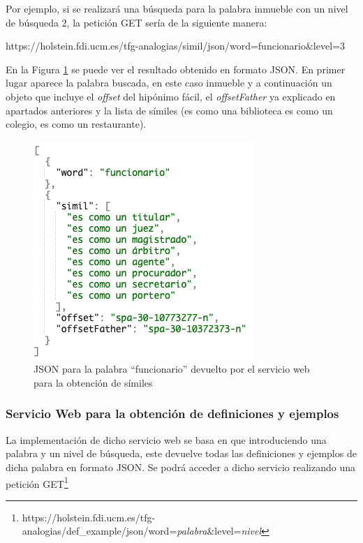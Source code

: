 Por ejemplo, si se realizará una búsqueda para la palabra inmueble con un nivel de búsqueda 2, la petición GET sería de la siguiente manera:

https://holstein.fdi.ucm.es/tfg-analogias/simil/json/word=funcionario\&level=3

En la Figura \ref{fig:peticionSimil} se puede ver el resultado obtenido en formato JSON. En primer lugar aparece la palabra buscada, en este caso inmueble y a continuación un objeto que incluye el \textit{offset} del hipónimo fácil, el \textit{offsetFather}  ya explicado en apartados anteriores y la lista de símiles (es como una biblioteca es como un colegio, es como un restaurante).

\begin{figure}[!h]
	\includegraphics[width=.6\textwidth]{Imagenes/Bitmap/Capitulo4/JSON-SW/peticionSimil.png}
	\centering
	\caption{JSON para la palabra ``funcionario'' devuelto por el servicio web para la obtención de símiles}
	\label{fig:peticionSimil}
\end{figure}


\subsubsection{Servicio Web para la obtención de definiciones y ejemplos}
\label{cap:subsec:sw_def_example}

La implementación de dicho servicio web se basa en que introduciendo una palabra y un nivel de búsqueda, este devuelve todas las definiciones y ejemplos de dicha palabra en formato JSON. Se podrá acceder a dicho servicio realizando una petición GET\footnote{https://holstein.fdi.ucm.es/tfg-analogias/def\_example/json/word=\textit{palabra}\&level=\textit{nivel}}


